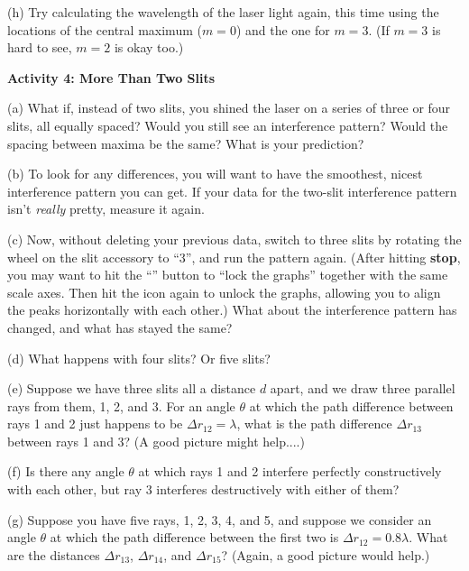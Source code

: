 (h) Try calculating the wavelength of the laser light again, this time using the locations of the central maximum ($m=0$) and the one for $m=3$.  (If $m=3$ is hard to see, $m=2$ is okay too.)
\answerspace{1.0in}


\pagebreak[2]
\textbf{Activity 4: More Than Two Slits}

(a) What if, instead of two slits, you shined the laser on a series of three or four slits, all equally spaced?  Would you still see an interference pattern?  Would the spacing between maxima be the same?  What is your prediction?
\answerspace{0.8in}

(b) To look for any differences, you will want to have the smoothest, nicest interference pattern you can get.  If your data for the two-slit interference pattern isn't \textit{really} pretty, measure it again.  

(c) Now, without deleting your previous data, switch to three slits by rotating the wheel on the slit accessory 
to ``3'', and run the pattern again.  (After hitting \textbf{stop}, you may want to hit the
``''
button to ``lock the graphs'' together with the same scale axes.  Then hit the icon again to unlock the graphs, allowing you to align the peaks horizontally with each other.)  What about the interference pattern has changed, and what has stayed the same?
\answerspace{0.8in}

(d) What happens with four slits?  Or five slits?
\answerspace{0.8in}

(e) Suppose we have three slits all a distance $d$ apart, and we draw three parallel rays from them, 1, 2, and 3.  For an angle $\theta$ at which the path difference between rays 1 and 2 just happens to be $\Delta r_{12} = \lambda$, what is the path difference $\Delta r_{13}$ between rays 1 and 3?  (A good picture might help....)
\answerspace{1.5in}

(f) Is there any angle $\theta$ at which rays 1 and 2 interfere perfectly constructively with each other,  but ray 3 interferes destructively with either of them?
\answerspace{0.4in}

\pagebreak[2]
(g) Suppose you have five rays, 1, 2, 3, 4, and 5, and suppose we consider an angle $\theta$ at which the path difference between the first two is $\Delta r_{12} = 0.8\lambda$.  What are the distances $\Delta r_{13}$, $\Delta r_{14}$, and $\Delta r_{15}$?  (Again, a good picture would help.)
\answerspace{2.5in}

